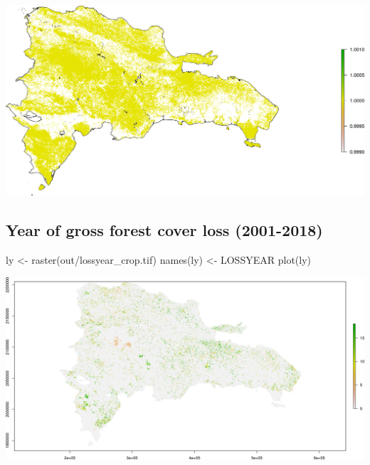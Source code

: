 \documentclass[10pt,landscape,a3paper]{article}
\newenvironment{Shaded}{\begin{snugshade}}{\end{snugshade}}
\newcommand{\FunctionTok}[1]{\textcolor[rgb]{0.00,0.00,0.00}{#1}}
\newcommand{\NormalTok}[1]{#1}
\newcommand{\OtherTok}[1]{\textcolor[rgb]{0.56,0.35,0.01}{#1}}
\newcommand{\StringTok}[1]{\textcolor[rgb]{0.31,0.60,0.02}{#1}}
\begin{document}
\begin{center}\includegraphics{img/data-download-preparation-eda/tree-canopy-cover-2000-nationwide-2} \end{center}

\hypertarget{year-of-gross-forest-cover-loss-2001-2018}{%
\subsection{Year of gross forest cover loss
(2001-2018)}\label{year-of-gross-forest-cover-loss-2001-2018}}

\begin{Shaded}
\begin{Highlighting}[]
\NormalTok{ly }\OtherTok{\textless{}{-}} \FunctionTok{raster}\NormalTok{(}\StringTok{\textquotesingle{}out/lossyear\_crop.tif\textquotesingle{}}\NormalTok{)}
\FunctionTok{names}\NormalTok{(ly) }\OtherTok{\textless{}{-}} \StringTok{\textquotesingle{}LOSSYEAR\textquotesingle{}}
\FunctionTok{plot}\NormalTok{(ly)}
\end{Highlighting}
\end{Shaded}

\begin{center}\includegraphics{img/data-download-preparation-eda/year-of-gross-forest-cover-loss-nationwide-1} \end{center}
\end{document}
